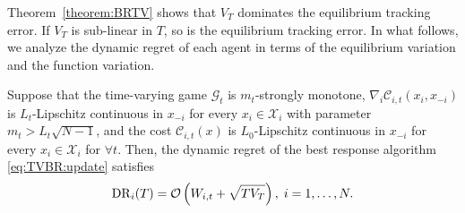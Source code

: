 Theorem~\ref{theorem:BRTV} shows that $V_T$ dominates the equilibrium tracking error. If $V_T$ is sub-linear in $T$, so is the equilibrium tracking error.
%
In what follows, we analyze the dynamic regret of each agent in terms of the equilibrium variation and the function variation.
\begin{theorem}\label{theorem:BRTV:no_regret}
Suppose that the time-varying game $\mathcal{G}_t$ is $m_t$-strongly monotone, $\nabla_i \mathcal{C}_{i,t}(x_i,x_{-i})$ is $L_t$-Lipschitz continuous in $x_{-i}$ for every $x_i \in \mathcal{X}_i$ with parameter $m_t>L_t \sqrt{N-1}$, and the cost $\mathcal{C}_{i,t}(x)$ is $L_0$-Lipschitz continuous in $x_{-i}$ for every $x_i \in \mathcal{X}_i$ for $\forall t$. Then, the dynamic regret of the best response algorithm \eqref{eq:TVBR:update} satisfies
\begin{align}
    {\rm{DR}}_i(T)  = \mathcal{O}\left( W_{i,t} +\sqrt{TV_T} \right), \; i=1,\ldots,N.
\end{align}
\end{theorem}

